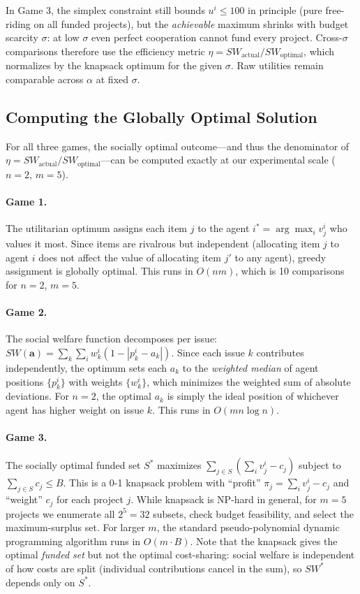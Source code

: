 In Game 3, the simplex constraint still bounds $u^i \leq 100$ in principle (pure free-riding on all funded projects), but the \emph{achievable} maximum shrinks with budget scarcity $\sigma$: at low $\sigma$ even perfect cooperation cannot fund every project.
Cross-$\sigma$ comparisons therefore use the efficiency metric $\eta = SW_{\text{actual}} / SW_{\text{optimal}}$, which normalizes by the knapsack optimum for the given $\sigma$.
Raw utilities remain comparable across $\alpha$ at fixed $\sigma$.

\subsection{Computing the Globally Optimal Solution}
\label{sec:optimal_computation}

For all three games, the socially optimal outcome---and thus the denominator of $\eta = SW_{\text{actual}} / SW_{\text{optimal}}$---can be computed exactly at our experimental scale ($n = 2$, $m = 5$).

\paragraph{Game 1.}
The utilitarian optimum assigns each item $j$ to the agent $i^* = \arg\max_i v^i_j$ who values it most.
Since items are rivalrous but independent (allocating item $j$ to agent $i$ does not affect the value of allocating item $j'$ to any agent), greedy assignment is globally optimal.
This runs in $O(nm)$, which is 10 comparisons for $n=2$, $m=5$.

\paragraph{Game 2.}
The social welfare function decomposes per issue: $SW(\bm{a}) = \sum_k \sum_i w^i_k (1 - |p^i_k - a_k|)$.
Since each issue $k$ contributes independently, the optimum sets each $a_k$ to the \emph{weighted median} of agent positions $\{p^i_k\}$ with weights $\{w^i_k\}$, which minimizes the weighted sum of absolute deviations.
For $n = 2$, the optimal $a_k$ is simply the ideal position of whichever agent has higher weight on issue $k$.
This runs in $O(mn \log n)$.

\paragraph{Game 3.}
The socially optimal funded set $S^*$ maximizes $\sum_{j \in S} (\sum_i v^i_j - c_j)$ subject to $\sum_{j \in S} c_j \leq B$.
This is a 0-1 knapsack problem with ``profit'' $\pi_j = \sum_i v^i_j - c_j$ and ``weight'' $c_j$ for each project $j$.
While knapsack is NP-hard in general, for $m = 5$ projects we enumerate all $2^5 = 32$ subsets, check budget feasibility, and select the maximum-surplus set.
For larger $m$, the standard pseudo-polynomial dynamic programming algorithm runs in $O(m \cdot B)$.
Note that the knapsack gives the optimal \emph{funded set} but not the optimal cost-sharing: social welfare is independent of how costs are split (individual contributions cancel in the sum), so $SW^*$ depends only on $S^*$.

